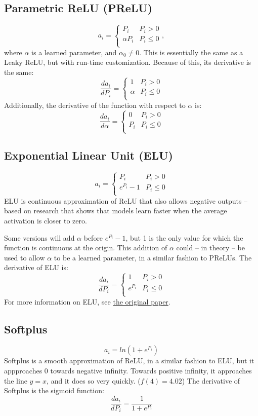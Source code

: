 \documentclass[fleqn]{article}
\begin{document}
\subsection{Parametric ReLU (PReLU)}
\[ a_i = \begin{cases}
	P_i & P_i > 0\\
	\alpha P_i & P_i \leq 0\\
\end{cases}, \]
where $\alpha$ is a learned parameter, and $\alpha_0 \neq 0$. This is
essentially the same as a Leaky ReLU, but with run-time customization.
Because of this, its derivative is the same:
\[ \frac{d a_i}{d P_i} = \begin{cases}
	1 & P_i > 0\\
	\alpha & P_i \leq 0\\
\end{cases} \]
Additionally, the derivative of the function with respect to $\alpha$ is:
\[ \frac{d a_i}{d \alpha} = \begin{cases}
	0 & P_i > 0\\
	P_i & P_i \leq 0\\
\end{cases} \]

\subsection{Exponential Linear Unit (ELU)}
\[ a_i = \begin{cases}
	P_i & P_i > 0 \\
	e^{P_i} -1 & P_i \leq 0 \\
\end{cases} \]
ELU is continuous approximation of ReLU that also allows negative
outputs -- based on research that shows that models learn faster when the
average activation is closer to zero.

Some versions will add $\alpha$ before $e^{P_i} -1$, but 1 is the only
value for which the function is continuous at the origin. This addition
of $\alpha$ could -- in theory -- be used to allow $\alpha$ to be a
learned parameter, in a similar fashion to PReLUs. The derivative of ELU
is:
\[ \frac{d a_i}{d P_i} = \begin{cases}
	1 & P_i > 0\\
	e^{P_i} & P_i \leq 0\\
\end{cases} \]
For more information on ELU, see
\href{https://arxiv.org/pdf/1511.07289.pdf}{the original paper}.

\subsection{Softplus}
\[ a_i = ln(1 + e^{P_i}) \]
Softplus is a smooth approximation of ReLU, in a similar fashion to ELU,
but it appproaches 0 towards negative infinity. Towards positive infinity,
it approaches the line $y=x$, and it does so very quickly. ($f(4)=4.02$)
The derivative of Softplus is the sigmoid function:
\[ \frac{d a_i}{d P_i} = \frac{1}{1 + e^{P_i}} \]
\end{document}
